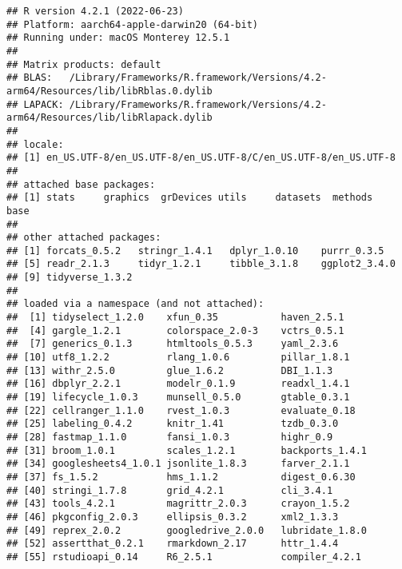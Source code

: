 \documentclass[
]{article}
\begin{document}
\begin{verbatim}
## R version 4.2.1 (2022-06-23)
## Platform: aarch64-apple-darwin20 (64-bit)
## Running under: macOS Monterey 12.5.1
## 
## Matrix products: default
## BLAS:   /Library/Frameworks/R.framework/Versions/4.2-arm64/Resources/lib/libRblas.0.dylib
## LAPACK: /Library/Frameworks/R.framework/Versions/4.2-arm64/Resources/lib/libRlapack.dylib
## 
## locale:
## [1] en_US.UTF-8/en_US.UTF-8/en_US.UTF-8/C/en_US.UTF-8/en_US.UTF-8
## 
## attached base packages:
## [1] stats     graphics  grDevices utils     datasets  methods   base     
## 
## other attached packages:
## [1] forcats_0.5.2   stringr_1.4.1   dplyr_1.0.10    purrr_0.3.5    
## [5] readr_2.1.3     tidyr_1.2.1     tibble_3.1.8    ggplot2_3.4.0  
## [9] tidyverse_1.3.2
## 
## loaded via a namespace (and not attached):
##  [1] tidyselect_1.2.0    xfun_0.35           haven_2.5.1        
##  [4] gargle_1.2.1        colorspace_2.0-3    vctrs_0.5.1        
##  [7] generics_0.1.3      htmltools_0.5.3     yaml_2.3.6         
## [10] utf8_1.2.2          rlang_1.0.6         pillar_1.8.1       
## [13] withr_2.5.0         glue_1.6.2          DBI_1.1.3          
## [16] dbplyr_2.2.1        modelr_0.1.9        readxl_1.4.1       
## [19] lifecycle_1.0.3     munsell_0.5.0       gtable_0.3.1       
## [22] cellranger_1.1.0    rvest_1.0.3         evaluate_0.18      
## [25] labeling_0.4.2      knitr_1.41          tzdb_0.3.0         
## [28] fastmap_1.1.0       fansi_1.0.3         highr_0.9          
## [31] broom_1.0.1         scales_1.2.1        backports_1.4.1    
## [34] googlesheets4_1.0.1 jsonlite_1.8.3      farver_2.1.1       
## [37] fs_1.5.2            hms_1.1.2           digest_0.6.30      
## [40] stringi_1.7.8       grid_4.2.1          cli_3.4.1          
## [43] tools_4.2.1         magrittr_2.0.3      crayon_1.5.2       
## [46] pkgconfig_2.0.3     ellipsis_0.3.2      xml2_1.3.3         
## [49] reprex_2.0.2        googledrive_2.0.0   lubridate_1.8.0    
## [52] assertthat_0.2.1    rmarkdown_2.17      httr_1.4.4         
## [55] rstudioapi_0.14     R6_2.5.1            compiler_4.2.1
\end{verbatim}
\end{document}
